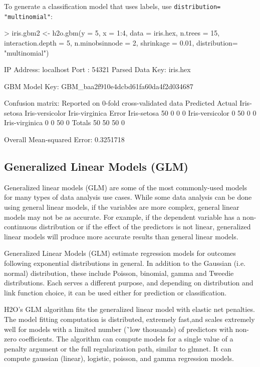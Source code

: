 \documentclass[11pt]{article}
\begin{document}
{\begin{spverbatim}
\end{spverbatim}

To generate a classification model that uses labels, use {\texttt{distribution= "multinomial"}}: 
\begin{spverbatim}
> iris.gbm2 <- h2o.gbm(y = 5, x = 1:4, data = iris.hex, n.trees = 15,
 interaction.depth = 5, n.minobsinnode = 2, shrinkage = 0.01, distribution= "multinomial")
   
IP Address: localhost 
Port      : 54321 
Parsed Data Key: iris.hex 

GBM Model Key: GBM_baa2f910e4dcbd61fa60da4f2d034687 

Confusion matrix:
Reported on 0-fold cross-validated data 
                 Predicted
Actual            Iris-setosa Iris-versicolor Iris-virginica Error
  Iris-setosa              50               0              0     0
  Iris-versicolor           0              50              0     0
  Iris-virginica            0               0             50     0
  Totals                   50              50             50     0

Overall Mean-squared Error:  0.3251718 
\end{spverbatim}

\subsection{Generalized Linear Models (GLM)}


Generalized linear models (GLM) are some of the most commonly-used models for many types of data analysis use cases. While some data analysis can be done using general linear models, if the variables are more complex, general linear models may not be as accurate. For example, if the dependent variable has a non-continuous distribution or if the effect of the predictors is not linear, generalized linear models will produce more accurate results than general linear models.  

Generalized Linear Models (GLM) estimate regression models for outcomes following exponential distributions in general. In addition to the Gaussian (i.e. normal) distribution, these include Poisson, binomial, gamma and Tweedie distributions. Each serves a different purpose, and depending on distribution and link function choice, it can be used either for prediction or classification.

H2O's GLM algorithm fits the generalized linear model with elastic net penalties. The model fitting computation is distributed, extremely fast,and scales extremely well for models with a limited number (\~\ low thousands) of predictors with non-zero coefficients. The algorithm can compute models for a single value of a penalty argument or the full regularization path, similar to glmnet. It can compute gaussian (linear), logistic, poisson, and gamma regression models.


}
\end{document}
